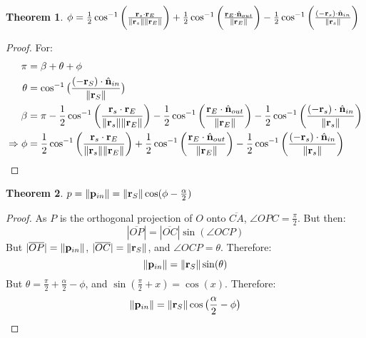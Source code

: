 \documentclass{article}
\theoremstyle{mystyle}
\newtheorem{theorem}{Theorem}[section]
\DeclarePairedDelimiter\norm{\lVert}{\rVert}
\begin{document}
\begin{theorem}
$\phi = \frac{1}{2}\cos^{-1}\bigg(\frac{\mathbf{r}_{s}\cdot \mathbf{r}_{E}}{\norm{\mathbf{r}_{s}}\norm{\mathbf{r}_{E}}}\bigg) + \frac{1}{2}\cos^{-1}\bigg(\frac{\mathbf{r}_{E}\cdot \hat{\mathbf{n}}_{out}}{\norm{\mathbf{r}_{E}}}\bigg) - \frac{1}{2}\cos^{-1}\bigg(\frac{(-\mathbf{r}_{s})\cdot \hat{\mathbf{n}}_{in}}{\norm{\mathbf{r}_{s}}}\bigg) $
\end{theorem}
\begin{proof}
For:
\begin{align*}
    \pi &=\beta+\theta+\phi\\
    \theta &= \cos^{-1}\big(\frac{(-\mathbf{r}_{S})\cdot\hat{\mathbf{n}}_{in}}{\norm{\mathbf{r}_{S}}}\big)\\
    \beta &= \pi-\frac{1}{2}\cos^{-1}\bigg(\frac{\mathbf{r}_{s}\cdot \mathbf{r}_{E}}{\norm{\mathbf{r}_{s}}\norm{\mathbf{r}_{E}}}\bigg) - \frac{1}{2}\cos^{-1}\bigg(\frac{\mathbf{r}_{E}\cdot \hat{\mathbf{n}}_{out}}{\norm{\mathbf{r}_{E}}}\bigg) - \frac{1}{2}\cos^{-1}\bigg(\frac{(-\mathbf{r}_{s})\cdot \hat{\mathbf{n}}_{in}}{\norm{\mathbf{r}_{s}}}\bigg)\\
    \Rightarrow \phi & = \frac{1}{2}\cos^{-1}\bigg(\frac{\mathbf{r}_{s}\cdot \mathbf{r}_{E}}{\norm{\mathbf{r}_{s}}\norm{\mathbf{r}_{E}}}\bigg) + \frac{1}{2}\cos^{-1}\bigg(\frac{\mathbf{r}_{E}\cdot \hat{\mathbf{n}}_{out}}{\norm{\mathbf{r}_{E}}}\bigg) - \frac{1}{2}\cos^{-1}\bigg(\frac{(-\mathbf{r}_{s})\cdot \hat{\mathbf{n}}_{in}}{\norm{\mathbf{r}_{s}}}\bigg)
\end{align*}
\end{proof}
\begin{theorem}
\label{theorem:impact_parameter_p_closed_form_solution}
$p = \norm{\mathbf{p}_{in}} = \norm{\mathbf{r}_{S}}\cos(\phi - \frac{\alpha}{2})$
\end{theorem}
\begin{proof}
As $P$ is the orthogonal projection of $O$ onto $\overline{CA}$, $\angle OPC = \frac{\pi}{2}$. But then:
\begin{equation*}
    |\overline{OP}| = |\overline{OC}|\sin(\angle OCP)
\end{equation*}
But $|\overline{OP}| = \norm{\mathbf{p}_{in}}$, $|\overline{OC}| = \norm{\mathbf{r}_{S}}$, and $\angle OCP = \theta$. Therefore:
\begin{equation*}
    \norm{\mathbf{p}_{in}} = \norm{\mathbf{r}_{S}}\sin(\theta)
\end{equation*}
But $\theta = \frac{\pi}{2} + \frac{\alpha}{2} - \phi$, and $\sin(\frac{\pi}{2}+x) = \cos(x)$. Therefore:
\begin{equation*}
    \norm{\mathbf{p}_{in}} = \norm{\mathbf{r}_{S}}\cos\big(\frac{\alpha}{2} - \phi\big)
\end{equation*}
\end{proof}
\end{document}
